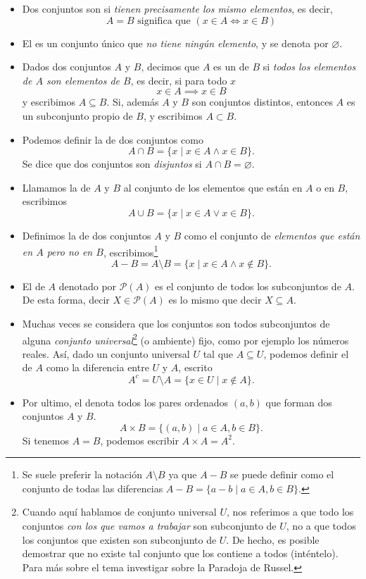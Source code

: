\documentclass[12pt]{book}
\begin{document}
\begin{itemize}
    \item Dos conjuntos son  si \textit{tienen precisamente los mismo elementos}, es decir, 
    \[A=B \text{ significa que } (x\in A \iff x\in B)\]
    \item El  es un conjunto único que \textit{no tiene ningún elemento}, y se denota por $\varnothing$.
    \item Dados dos conjuntos $A$ y $B$, decimos que $A$ es un  de $B$ si \textit{todos los elementos de $A$ son elementos de $B$}, es decir, si para todo $x$
    \[x\in A \implies x\in B\]
    y escribimos $A\subseteq B$. Si, además $A$ y $B$ son conjuntos distintos, entonces $A$ es un subconjunto propio de $B$, y escribimos $A\subset B$.
    \item Podemos definir la  de dos conjuntos como 
    \[A\cap B=\{x\mid x\in A \wedge x\in B\}.\] 
    Se dice que dos conjuntos son \textit{disjuntos} si $A\cap B=\varnothing$.
    \item Llamamos la  de $A$ y $B$ al conjunto de los elementos que están en $A$ o en $B$, escribimos 
    \[A\cup B=\{x\mid x\in A \vee x\in B\}.\]
    \item Definimos la  de dos conjuntos $A$ y $B$ como el conjunto de \textit{elementos que están en $A$ pero no en $B$}, escribimos\footnote{Se suele preferir la notación $A\setminus B$ ya que $A-B$ se puede definir como el conjunto de todas las diferencias $A-B=\{a-b\mid a\in A, b\in B\}$.}
    \[A-B=A\setminus B=\{x\mid x\in A \wedge x\notin B\}.\]
    \item El  de $A$ denotado por $\mathcal{P}(A)$ es el conjunto de todos los subconjuntos de $A$. De esta forma, decir $X\in\mathcal{P}(A)$ es lo mismo que decir $X\subseteq A$.
    \item Muchas veces se considera que los conjuntos son todos subconjuntos de alguna \textit{conjunto universal}\footnote{Cuando aquí hablamos de conjunto universal $U$, nos referimos a que todo los conjuntos \emph{con los que vamos a trabajar} son subconjunto de $U$, no a que todos los conjuntos que existen son subconjunto de $U$. De hecho, es posible demostrar que no existe tal conjunto que los contiene a todos (inténtelo). Para más sobre el tema investigar sobre la Paradoja de Russel.} (o ambiente) fijo, como por ejemplo los números reales. Así, dado un conjunto universal $U$ tal que $A\subseteq U$, podemos definir el  de $A$ como la diferencia entre $U$ y $A$, escrito
    \[A^c=U\setminus A=\{x\in U \mid x\notin A\}.\]
    \item  Por ultimo, el  denota todos los pares ordenados $(a,b)$ que forman dos conjuntos $A$ y $B$. 
    \[A\times B=\{(a,b)\mid a\in A, b\in B\}.\] 
    Si tenemos $A=B$, podemos escribir $A\times A=A^2.$\\
\end{itemize}
\end{document}
